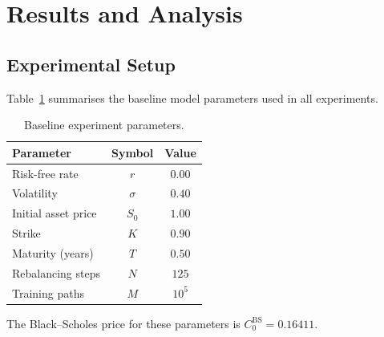 %

\section{Results and Analysis}
\label{sec:results}

\subsection{Experimental Setup}
\label{subsec:setup}

Table~\ref{tab:params} summarises the baseline model parameters used in all experiments.

\begin{table}[H]
    \centering
    \caption{Baseline experiment parameters.}
    \label{tab:params}
    \begin{tabular}{lcc}
        \toprule
        Parameter & Symbol & Value \\
        \midrule
        Risk-free rate          & $r$       & $0.00$ \\
        Volatility              & $\sigma$  & $0.40$ \\
        Initial asset price     & $S_0$     & $1.00$ \\
        Strike                  & $K$       & $0.90$ \\
        Maturity (years)        & $T$       & $0.50$ \\
        Rebalancing steps       & $N$       & $125$  \\
        Training paths          & $M$       & $10^5$ \\
        \bottomrule
    \end{tabular}
\end{table}

The Black--Scholes price for these parameters is $C_0^{\mathrm{BS}} = 0.16411$.

